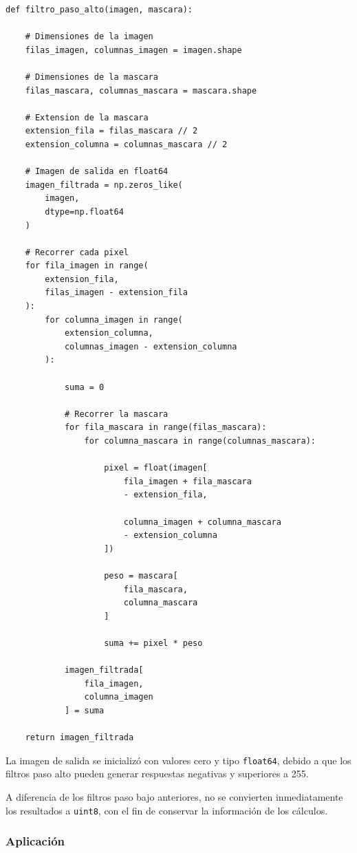\documentclass[11pt,letterpaper]{article}
\begin{document}
\begin{lstlisting}
def filtro_paso_alto(imagen, mascara):

    # Dimensiones de la imagen
    filas_imagen, columnas_imagen = imagen.shape

    # Dimensiones de la mascara
    filas_mascara, columnas_mascara = mascara.shape

    # Extension de la mascara
    extension_fila = filas_mascara // 2
    extension_columna = columnas_mascara // 2

    # Imagen de salida en float64
    imagen_filtrada = np.zeros_like(
        imagen,
        dtype=np.float64
    )

    # Recorrer cada pixel
    for fila_imagen in range(
        extension_fila,
        filas_imagen - extension_fila
    ):
        for columna_imagen in range(
            extension_columna,
            columnas_imagen - extension_columna
        ):

            suma = 0

            # Recorrer la mascara
            for fila_mascara in range(filas_mascara):
                for columna_mascara in range(columnas_mascara):

                    pixel = float(imagen[
                        fila_imagen + fila_mascara
                        - extension_fila,

                        columna_imagen + columna_mascara
                        - extension_columna
                    ])

                    peso = mascara[
                        fila_mascara,
                        columna_mascara
                    ]

                    suma += pixel * peso

            imagen_filtrada[
                fila_imagen,
                columna_imagen
            ] = suma

    return imagen_filtrada
\end{lstlisting}

La imagen de salida se inicializó
con valores cero y tipo
\texttt{float64}, debido a que
los filtros paso alto pueden generar
respuestas negativas y superiores a 255.

A diferencia de los filtros paso bajo
anteriores, no se convierten
inmediatamente los resultados a
\texttt{uint8}, con el fin de conservar
la información de los cálculos.

\subsubsection*{Aplicación}
\end{document}
